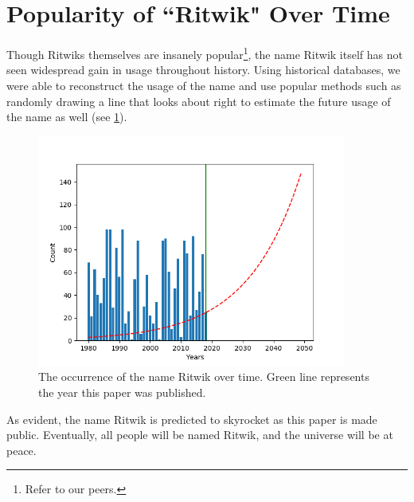 \documentclass[]{article}
\begin{document}
\section{Popularity of ``Ritwik" Over Time}
Though Ritwiks themselves are insanely popular\footnote{Refer to our peers.}, the name Ritwik itself has not seen widespread gain in usage throughout history. Using historical databases, we were able to reconstruct the usage of the name and use popular methods such as randomly drawing a line that looks about right to estimate the future usage of the name as well (see \ref{fig:usageofritwik}).
\begin{figure}[h]
	\centering
	\includegraphics[width=4in]{figures/UsageOfRitwik}
	\caption{The occurrence of the name Ritwik over time. Green line represents the year this paper was published.}
	\label{fig:usageofritwik}
\end{figure}
As evident, the name Ritwik is predicted to skyrocket as this paper is made public. Eventually, all people will be named Ritwik, and the universe will be at peace.
\end{document}
